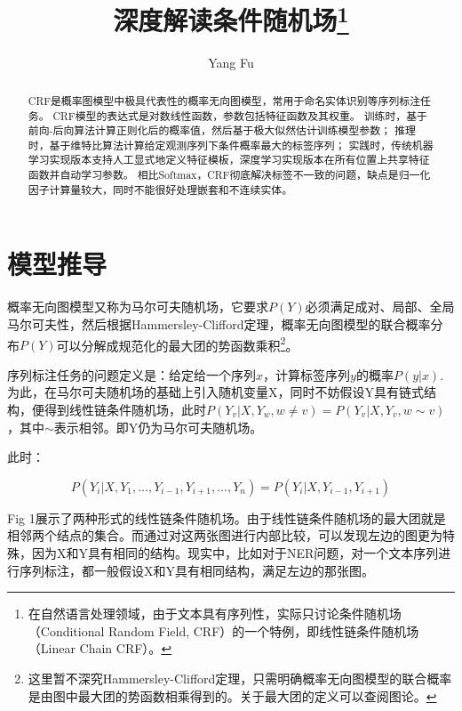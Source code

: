 \documentclass[11pt]{article}
\title{深度解读条件随机场\footnote{在自然语言处理领域，由于文本具有序列性，实际只讨论条件随机场（Conditional Random Field, CRF）的一个特例，即线性链条件随机场（Linear Chain CRF）。}}
\author{Yang Fu}
\begin{document}
\maketitle

\begin{abstract}
CRF是概率图模型中极具代表性的概率无向图模型，常用于命名实体识别等序列标注任务。
CRF模型的表达式是对数线性函数，参数包括特征函数及其权重。
训练时，基于前向-后向算法计算正则化后的概率值，然后基于极大似然估计训练模型参数；
推理时，基于维特比算法计算给定观测序列下条件概率最大的标签序列；
实践时，传统机器学习实现版本支持人工显式地定义特征模板，深度学习实现版本在所有位置上共享特征函数并自动学习参数。
相比Softmax，CRF彻底解决标签不一致的问题，缺点是归一化因子计算量较大，同时不能很好处理嵌套和不连续实体。

\end{abstract}

\section{模型推导}

概率无向图模型又称为马尔可夫随机场，它要求$P(Y)$必须满足成对、局部、全局马尔可夫性，然后根据Hammersley-Clifford定理，概率无向图模型的联合概率分布$P(Y)$可以分解成规范化的最大团的势函数乘积\footnote{这里暂不深究Hammersley-Clifford定理，只需明确概率无向图模型的联合概率是由图中最大团的势函数相乘得到的。关于最大团的定义可以查阅图论。}。

序列标注任务的问题定义是：给定给一个序列$x$，计算标签序列$y$的概率$P(y|x)$. 为此，在马尔可夫随机场的基础上引入随机变量X，同时不妨假设Y具有链式结构，便得到线性链条件随机场，此时$P(Y_v|X, Y_w, w \neq v) = P(Y_v|X, Y_v, w \sim v)$，其中$\sim$表示相邻。即Y仍为马尔可夫随机场。

此时：

\begin{equation}\label{key}
	P(Y_i|X, Y_1, ..., Y_{i-1}, Y_{i+1}, ..., Y_n) = P(Y_i|X, Y_{i-1}, Y_{i+1})
\end{equation}

Fig 1展示了两种形式的线性链条件随机场。由于线性链条件随机场的最大团就是相邻两个结点的集合。而通过对这两张图进行内部比较，可以发现左边的图更为特殊，因为X和Y具有相同的结构。现实中，比如对于NER问题，对一个文本序列进行序列标注，都一般假设X和Y具有相同结构，满足左边的那张图。
\end{document}
